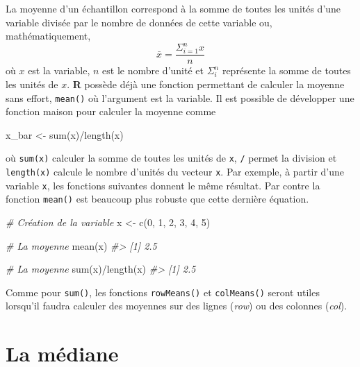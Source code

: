 \documentclass[
]{book}
\newenvironment{Shaded}{}{}
\newcommand{\CommentTok}[1]{\textit{#1}}
\newcommand{\DecValTok}[1]{#1}
\newcommand{\FunctionTok}[1]{#1}
\newcommand{\NormalTok}[1]{#1}
\newcommand{\OtherTok}[1]{#1}
\newcommand{\SpecialCharTok}[1]{#1}
\begin{document}
La moyenne d'un échantillon correspond à la somme de toutes les unités d'une variable divisée par le nombre de données de cette variable ou, mathématiquement, \[\bar{x}=\frac{\Sigma_{i=1}^n x}{n} \] où \(x\) est la variable, \(n\) est le nombre d'unité et \(\Sigma_i^n\) représente la somme de toutes les unités de \(x\). \textbf{R} possède déjà une fonction permettant de calculer la moyenne sans effort, \texttt{mean()} où l'argument est la variable. Il est possible de développer une fonction maison pour calculer la moyenne comme

\begin{Shaded}
\begin{Highlighting}[]
\NormalTok{x\_bar }\OtherTok{\textless{}{-}} \FunctionTok{sum}\NormalTok{(x)}\SpecialCharTok{/}\FunctionTok{length}\NormalTok{(x)}
\end{Highlighting}
\end{Shaded}

où \texttt{sum(x)} calculer la somme de toutes les unités de \texttt{x}, \texttt{/} permet la division et \texttt{length(x)} calcule le nombre d'unités du vecteur \texttt{x}. Par exemple, à partir d'une variable \texttt{x}, les fonctions suivantes donnent le même résultat. Par contre la fonction \texttt{mean()} est beaucoup plus robuste que cette dernière équation.

\begin{Shaded}
\begin{Highlighting}[]
\CommentTok{\# Création de la variable}
\NormalTok{x }\OtherTok{\textless{}{-}} \FunctionTok{c}\NormalTok{(}\DecValTok{0}\NormalTok{, }\DecValTok{1}\NormalTok{, }\DecValTok{2}\NormalTok{, }\DecValTok{3}\NormalTok{, }\DecValTok{4}\NormalTok{, }\DecValTok{5}\NormalTok{)}

\CommentTok{\# La moyenne}
\FunctionTok{mean}\NormalTok{(x)}
\CommentTok{\#\textgreater{} [1] 2.5}

\CommentTok{\# La moyenne}
\FunctionTok{sum}\NormalTok{(x)}\SpecialCharTok{/}\FunctionTok{length}\NormalTok{(x)}
\CommentTok{\#\textgreater{} [1] 2.5}
\end{Highlighting}
\end{Shaded}

Comme pour \texttt{sum()}, les fonctions \texttt{rowMeans()} et \texttt{colMeans()} seront utiles lorsqu'il faudra calculer des moyennes sur des lignes (\emph{row}) ou des colonnes (\emph{col}).

\hypertarget{la-muxe9diane}{%
\section{La médiane}\label{la-muxe9diane}}
\end{document}
